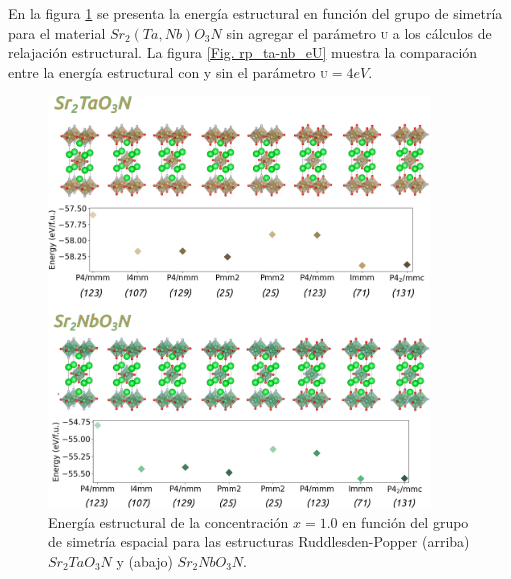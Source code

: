 \newpage
{}\label{anexoB}

En la figura \ref{Fig. rp_ta-nb_e} se presenta la energía estructural en función del grupo de simetría para el material $Sr_{2}(Ta,Nb)O_{3}N$ sin agregar el parámetro \textsc{u} a los cálculos de relajación estructural. La figura \ref{Fig. rp_ta-nb_eU} muestra la comparación entre la energía estructural con y sin el parámetro \textsc{u}$=4eV$.


\begin{figure}[H]
    \centering
    \includegraphics[width=0.9\textwidth]{Figs/rp_ta-nb_e.png}
    \caption{Energía estructural de la concentración $x=1.0$ en función del grupo de simetría espacial para las estructuras Ruddlesden-Popper (arriba) $Sr_{2}TaO_{3}N$ y (abajo) $Sr_{2}NbO_{3}N$.}
    \label{Fig. rp_ta-nb_e}
\end{figure}

